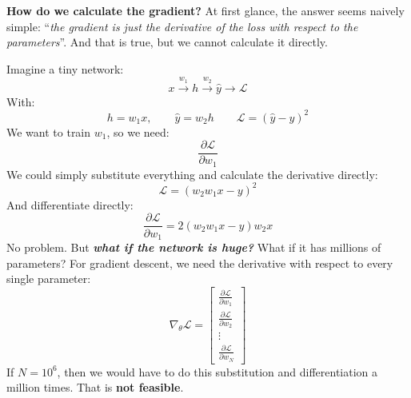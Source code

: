 \begin{remarkbox}
    \highspace
    \textcolor{Green3}{ \textbf{How do we calculate the gradient?}} At first glance, the answer seems naively simple: ``\emph{the gradient is just the derivative of the loss with respect to the parameters}''. And that is true, but we cannot calculate it directly.

    \highspace
    \textcolor{Red2}{} Imagine a tiny network:
    \begin{equation*}
        x \xrightarrow{w_1} h \xrightarrow{w_2} \hat{y} \to \mathcal{L}
    \end{equation*}
    With:
    \begin{equation*}
        h = w_1 x,
        \qquad
        \hat{y} = w_2 h
        \qquad
        \mathcal{L} = (\hat{y}-y)^2
    \end{equation*}
    We want to train $w_1$, so we need:
    \begin{equation*}
        \frac{\partial\mathcal{L}}{\partial w_1}
    \end{equation*}
    We could simply substitute everything and calculate the derivative directly:
    \begin{equation*}
        \mathcal{L} = (w_2 w_1 x - y)^2
    \end{equation*}
    And differentiate directly:
    \begin{equation*}
        \frac{\partial\mathcal{L}}{\partial w_1} = 2(w_2 w_1 x - y) w_2 x
    \end{equation*}
    No problem. But \emph{\textbf{what if the network is huge?}} What if it has millions of parameters? For gradient descent, we need the derivative with respect to every single parameter:
    \begin{equation*}
        \nabla_{\theta} \mathcal{L} =
        \begin{bmatrix}
            \frac{\partial\mathcal{L}}{\partial w_1}\\
            \frac{\partial\mathcal{L}}{\partial w_2}\\
            \vdots\\
            \frac{\partial\mathcal{L}}{\partial w_N}
        \end{bmatrix}
    \end{equation*}
    If $N = 10^6$, then we would have to do this substitution and differentiation a million times. That is \textbf{not feasible}.


\end{remarkbox}
